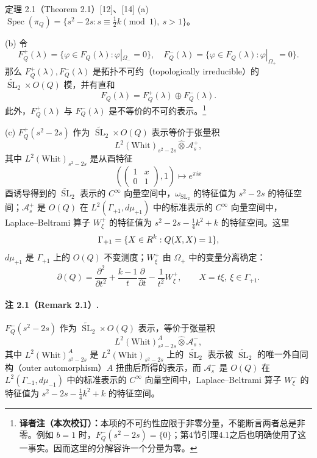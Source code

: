 \begin{originaltheorem}{定理 2.1（Theorem 2.1）[12]、[14]}
(a) $\operatorname{Spec}(\pi_Q)=\{s^2-2s:s\equiv\tfrac12k\pmod1,\ s>1\}$。

(b) 令
\[
 F_Q^+(\lambda)=\{\varphi\in F_Q(\lambda):\varphi|_{\Omega_-}=0\},\quad
 F_Q^-(\lambda)=\{\varphi\in F_Q(\lambda):\varphi|_{\Omega_+}=0\}.
\]
那么 $F_Q^+(\lambda),F_Q^-(\lambda)$ 是拓扑不可约（topologically irreducible）的 $\widetilde{\operatorname{SL}}_2\times O(Q)$ 模，并有直和
\[
 F_Q(\lambda)=F_Q^+(\lambda)\oplus F_Q^-(\lambda).
\]
此外，$F_Q^+(\lambda)$ 与 $F_Q^-(\lambda)$ 是不等价的不可约表示。\footnote{\textbf{译者注（本次校订）：}本项的不可约性应限于非零分量，不能断言两者总是非零。例如 $b=1$ 时，$F_Q^-(s^2-2s)=\{0\}$；第4节引理4.1之后也明确使用了这一事实。因而这里的分解容许一个分量为零。}

(c) $F_Q^+(s^2-2s)$ 作为 $\widetilde{\operatorname{SL}}_2\times O(Q)$ 表示等价于张量积
\[
 L^2(\mathrm{Whit})_{s^2-2s}\widehat\otimes\mathcal A_s^+,
\]
其中 $L^2(\mathrm{Whit})_{s^2-2s}$ 是从酉特征
\[
 \left(\begin{pmatrix}1&x\\0&1\end{pmatrix},1\right)\longmapsto e^{\pi ix}
\]
酉诱导得到的 $\widetilde{\operatorname{SL}}_2$ 表示的 $C^\infty$ 向量空间中，$\omega_{\operatorname{SL}_2}$ 的特征值为 $s^2-2s$ 的特征空间；$\mathcal A_s^+$ 是 $O(Q)$ 在 $L^2(\Gamma_{+1},d\mu_{+1})$ 中的标准表示的 $C^\infty$ 向量空间中，Laplace--Beltrami 算子 $W_\xi^+$ 的特征值为 $s^2-2s-\tfrac14k^2+k$ 的特征空间。这里
\[
 \Gamma_{+1}=\{X\in R^k:Q(X,X)=1\},
\]
$d\mu_{+1}$ 是 $\Gamma_{+1}$ 上的 $O(Q)$ 不变测度；$W_\xi^+$ 由 $\Omega_+$ 中的变量分离确定：
\[
 \partial(Q)=\frac{\partial^2}{\partial t^2}
 +\frac{k-1}{t}\frac{\partial}{\partial t}-\frac1{t^2}W_\xi^+,
 \qquad X=t\xi,\ \xi\in\Gamma_{+1}.
\]
\end{originaltheorem}

\paragraph*{注 2.1（Remark 2.1）.}
$F_Q^-(s^2-2s)$ 作为 $\widetilde{\operatorname{SL}}_2\times O(Q)$ 表示，等价于张量积
\[
 L^2(\mathrm{Whit})_{s^2-2s}^{A}\widehat\otimes\mathcal A_s^-,
\]
其中 $L^2(\mathrm{Whit})_{s^2-2s}^{A}$ 是 $L^2(\mathrm{Whit})_{s^2-2s}$ 上的 $\widetilde{\operatorname{SL}}_2$ 表示被 $\widetilde{\operatorname{SL}}_2$ 的唯一外自同构（outer automorphism）$A$ 扭曲后所得的表示，而 $\mathcal A_s^-$ 是 $O(Q)$ 在 $L^2(\Gamma_{-1},d\mu_{-1})$ 中的标准表示的 $C^\infty$ 向量空间中，Laplace--Beltrami 算子 $W_\xi^-$ 的特征值为 $s^2-2s-\tfrac14k^2+k$ 的特征空间。

